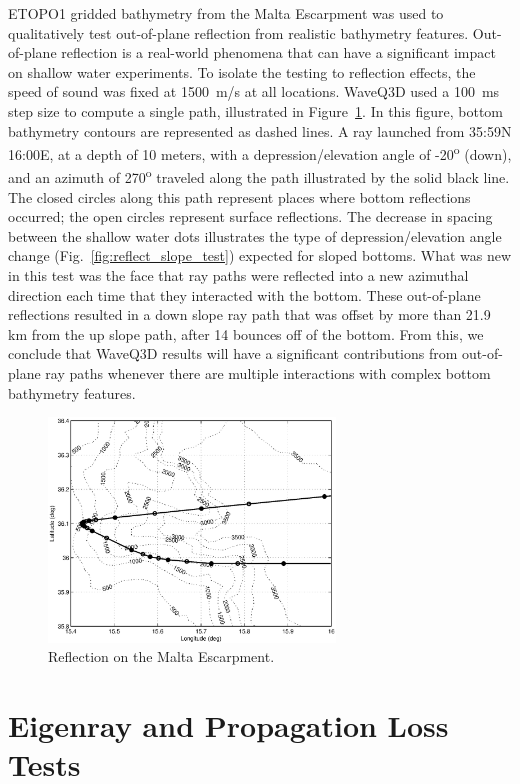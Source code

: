\documentclass{ws-jca}
\begin{document}
ETOPO1 gridded bathymetry\cite{ETOPO1} from the Malta Escarpment was used
to qualitatively test out-of-plane reflection from realistic bathymetry
features. Out-of-plane reflection is a real-world phenomena that can have a
significant impact on shallow water experiments.\cite{Sturm2008} To isolate
the testing to reflection effects, the speed of sound was fixed at 1500~m/s
at all locations. WaveQ3D used a 100~ms step size to compute a single path,
illustrated in Figure~\ref{fig:reflect_grid_malta}. In this figure, bottom
bathymetry contours are represented as dashed lines. A ray launched from
35:59N 16:00E, at a depth of 10 meters, with a depression/elevation angle
of -20\textsuperscript{o} (down), and an azimuth of 270\textsuperscript{o}
traveled along the path illustrated by the solid black line. The closed
circles along this path represent places where bottom reflections occurred;
the open circles represent surface reflections. The decrease in spacing
between the shallow water dots illustrates the type of depression/elevation
angle change (Fig.~\ref{fig:reflect_slope_test}) expected for sloped
bottoms. What was new in this test was the face that ray paths were
reflected into a new azimuthal direction each time that they interacted
with the bottom. These out-of-plane reflections resulted in a down slope
ray path that was offset by more than 21.9 km from the up slope path, after
14 bounces off of the bottom. From this, we conclude that WaveQ3D results
will have a significant contributions from out-of-plane ray paths whenever
there are multiple interactions with complex bottom bathymetry features.
\begin{figure}[th]
	\centerline{\includegraphics[width=3in]{reflect_grid_malta.eps}} 
	\vspace*{8pt}
	\caption{Reflection on the Malta Escarpment.
	\label{fig:reflect_grid_malta}}
\end{figure}

\section{Eigenray and Propagation Loss Tests}
\end{document}
